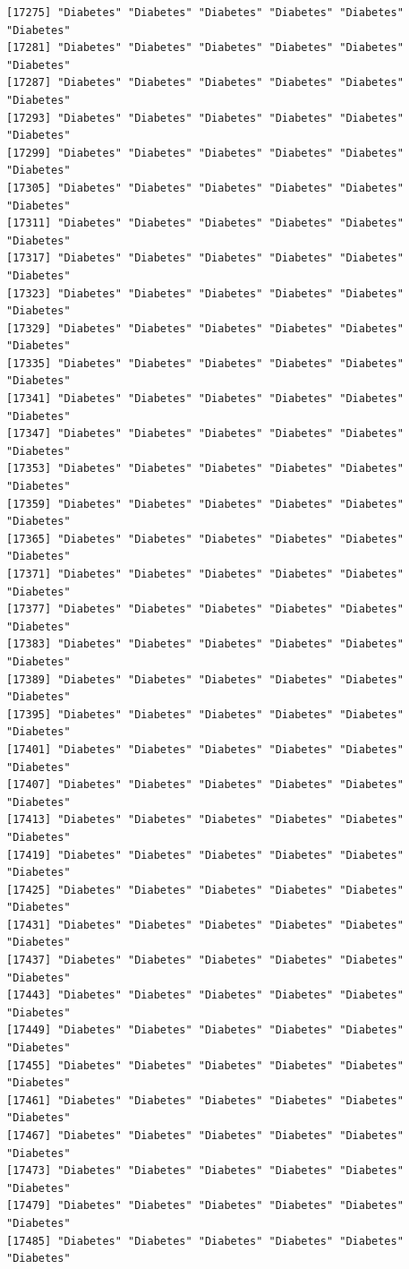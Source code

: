 \documentclass[
  letterpaper,
  DIV=11,
  numbers=noendperiod]{scrartcl}
\begin{document}
\begin{verbatim}
[17275] "Diabetes" "Diabetes" "Diabetes" "Diabetes" "Diabetes" "Diabetes"
[17281] "Diabetes" "Diabetes" "Diabetes" "Diabetes" "Diabetes" "Diabetes"
[17287] "Diabetes" "Diabetes" "Diabetes" "Diabetes" "Diabetes" "Diabetes"
[17293] "Diabetes" "Diabetes" "Diabetes" "Diabetes" "Diabetes" "Diabetes"
[17299] "Diabetes" "Diabetes" "Diabetes" "Diabetes" "Diabetes" "Diabetes"
[17305] "Diabetes" "Diabetes" "Diabetes" "Diabetes" "Diabetes" "Diabetes"
[17311] "Diabetes" "Diabetes" "Diabetes" "Diabetes" "Diabetes" "Diabetes"
[17317] "Diabetes" "Diabetes" "Diabetes" "Diabetes" "Diabetes" "Diabetes"
[17323] "Diabetes" "Diabetes" "Diabetes" "Diabetes" "Diabetes" "Diabetes"
[17329] "Diabetes" "Diabetes" "Diabetes" "Diabetes" "Diabetes" "Diabetes"
[17335] "Diabetes" "Diabetes" "Diabetes" "Diabetes" "Diabetes" "Diabetes"
[17341] "Diabetes" "Diabetes" "Diabetes" "Diabetes" "Diabetes" "Diabetes"
[17347] "Diabetes" "Diabetes" "Diabetes" "Diabetes" "Diabetes" "Diabetes"
[17353] "Diabetes" "Diabetes" "Diabetes" "Diabetes" "Diabetes" "Diabetes"
[17359] "Diabetes" "Diabetes" "Diabetes" "Diabetes" "Diabetes" "Diabetes"
[17365] "Diabetes" "Diabetes" "Diabetes" "Diabetes" "Diabetes" "Diabetes"
[17371] "Diabetes" "Diabetes" "Diabetes" "Diabetes" "Diabetes" "Diabetes"
[17377] "Diabetes" "Diabetes" "Diabetes" "Diabetes" "Diabetes" "Diabetes"
[17383] "Diabetes" "Diabetes" "Diabetes" "Diabetes" "Diabetes" "Diabetes"
[17389] "Diabetes" "Diabetes" "Diabetes" "Diabetes" "Diabetes" "Diabetes"
[17395] "Diabetes" "Diabetes" "Diabetes" "Diabetes" "Diabetes" "Diabetes"
[17401] "Diabetes" "Diabetes" "Diabetes" "Diabetes" "Diabetes" "Diabetes"
[17407] "Diabetes" "Diabetes" "Diabetes" "Diabetes" "Diabetes" "Diabetes"
[17413] "Diabetes" "Diabetes" "Diabetes" "Diabetes" "Diabetes" "Diabetes"
[17419] "Diabetes" "Diabetes" "Diabetes" "Diabetes" "Diabetes" "Diabetes"
[17425] "Diabetes" "Diabetes" "Diabetes" "Diabetes" "Diabetes" "Diabetes"
[17431] "Diabetes" "Diabetes" "Diabetes" "Diabetes" "Diabetes" "Diabetes"
[17437] "Diabetes" "Diabetes" "Diabetes" "Diabetes" "Diabetes" "Diabetes"
[17443] "Diabetes" "Diabetes" "Diabetes" "Diabetes" "Diabetes" "Diabetes"
[17449] "Diabetes" "Diabetes" "Diabetes" "Diabetes" "Diabetes" "Diabetes"
[17455] "Diabetes" "Diabetes" "Diabetes" "Diabetes" "Diabetes" "Diabetes"
[17461] "Diabetes" "Diabetes" "Diabetes" "Diabetes" "Diabetes" "Diabetes"
[17467] "Diabetes" "Diabetes" "Diabetes" "Diabetes" "Diabetes" "Diabetes"
[17473] "Diabetes" "Diabetes" "Diabetes" "Diabetes" "Diabetes" "Diabetes"
[17479] "Diabetes" "Diabetes" "Diabetes" "Diabetes" "Diabetes" "Diabetes"
[17485] "Diabetes" "Diabetes" "Diabetes" "Diabetes" "Diabetes" "Diabetes"

\end{verbatim}
\end{document}
